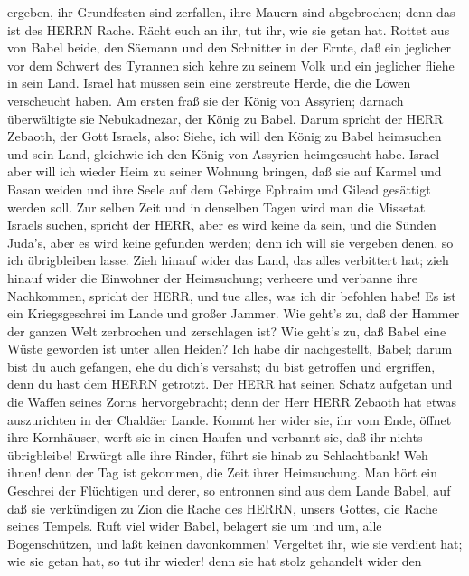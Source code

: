 ergeben, ihr Grundfesten sind zerfallen, ihre Mauern sind abgebrochen;
denn das ist des HERRN Rache. Rächt euch an ihr, tut ihr, wie sie getan
hat.  Rottet aus von Babel beide, den Säemann und den
Schnitter in der Ernte, daß ein jeglicher vor dem Schwert des Tyrannen
sich kehre zu seinem Volk und ein jeglicher fliehe in sein Land.
 Israel hat müssen sein eine zerstreute Herde, die die
Löwen verscheucht haben. Am ersten fraß sie der König von Assyrien;
darnach überwältigte sie Nebukadnezar, der König zu Babel. 
Darum spricht der HERR Zebaoth, der Gott Israels, also: Siehe, ich will
den König zu Babel heimsuchen und sein Land, gleichwie ich den König von
Assyrien heimgesucht habe.  Israel aber will ich wieder
Heim zu seiner Wohnung bringen, daß sie auf Karmel und Basan weiden und
ihre Seele auf dem Gebirge Ephraim und Gilead gesättigt werden soll.
 Zur selben Zeit und in denselben Tagen wird man die
Missetat Israels suchen, spricht der HERR, aber es wird keine da sein,
und die Sünden Juda's, aber es wird keine gefunden werden; denn ich will
sie vergeben denen, so ich übrigbleiben lasse.  Zieh hinauf
wider das Land, das alles verbittert hat; zieh hinauf wider die
Einwohner der Heimsuchung; verheere und verbanne ihre Nachkommen,
spricht der HERR, und tue alles, was ich dir befohlen habe!
 Es ist ein Kriegsgeschrei im Lande und großer Jammer.
 Wie geht's zu, daß der Hammer der ganzen Welt zerbrochen
und zerschlagen ist? Wie geht's zu, daß Babel eine Wüste geworden ist
unter allen Heiden?  Ich habe dir nachgestellt, Babel;
darum bist du auch gefangen, ehe du dich's versahst; du bist getroffen
und ergriffen, denn du hast dem HERRN getrotzt.  Der HERR
hat seinen Schatz aufgetan und die Waffen seines Zorns hervorgebracht;
denn der Herr HERR Zebaoth hat etwas auszurichten in der Chaldäer Lande.
 Kommt her wider sie, ihr vom Ende, öffnet ihre Kornhäuser,
werft sie in einen Haufen und verbannt sie, daß ihr nichts übrigbleibe!
 Erwürgt alle ihre Rinder, führt sie hinab zu Schlachtbank!
Weh ihnen! denn der Tag ist gekommen, die Zeit ihrer Heimsuchung.
 Man hört ein Geschrei der Flüchtigen und derer, so
entronnen sind aus dem Lande Babel, auf daß sie verkündigen zu Zion die
Rache des HERRN, unsers Gottes, die Rache seines Tempels. 
Ruft viel wider Babel, belagert sie um und um, alle Bogenschützen, und
laßt keinen davonkommen! Vergeltet ihr, wie sie verdient hat; wie sie
getan hat, so tut ihr wieder! denn sie hat stolz gehandelt wider den
